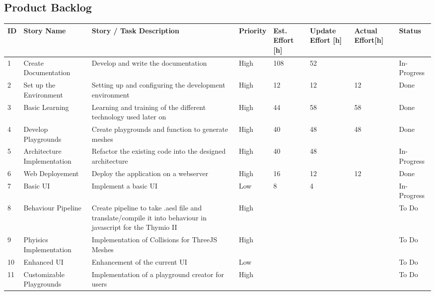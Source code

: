 \documentclass{scrartcl}
\begin{document}
\subsection{Product Backlog}
\begin{table}[]
  \begin{tabular}{l|l|l|l|l|l|l|l}
  ID                     & Story Name & Story / Task Description & Priority & Est. Effort {[}h{]} & Update Effort {[}h{]} & Actual Effort{[}h{]} & Status                \\ \hline
  \multicolumn{1}{|l|}{1} & Create Documentation & Develop and write the documentation & High & 108 & 52 &  & \multicolumn{1}{l|}{In-Progress} \\ \hline
  \multicolumn{1}{|l|}{2} & Set up the Environment & Setting up and configuring the development environment & High & 12 & 12 & 12 & \multicolumn{1}{l|}{Done} \\ \hline
  \multicolumn{1}{|l|}{3} & Basic Learning & Learning and training of the different technology used later on & High & 44 & 58 & 58 & \multicolumn{1}{l|}{Done} \\ \hline
  \multicolumn{1}{|l|}{4} & Develop Playgrounds & Create playgrounds and function to generate meshes & High & 40 & 48 & 48 & \multicolumn{1}{l|}{Done} \\ \hline
  \multicolumn{1}{|l|}{5} & Architecture Implementation & Refactor the existing code into the designed architecture & High & 40 & 48 &  & \multicolumn{1}{l|}{In-Progress} \\ \hline
  \multicolumn{1}{|l|}{6} & Web Deployement & Deploy the application on a webserver & High & 16 & 12 & 12 & \multicolumn{1}{l|}{Done} \\ \hline
  \multicolumn{1}{|l|}{7} & Basic UI & Implement a basic UI & Low & 8 & 4 &  & \multicolumn{1}{l|}{In-Progress} \\ \hline
  \multicolumn{1}{|l|}{8} & Behaviour Pipeline & Create pipeline to take .aesl file and translate/compile it into behaviour in javascript for the Thymio II & High &  &  &  & \multicolumn{1}{l|}{To Do} \\ \hline
  \multicolumn{1}{|l|}{9} & Phyisics Implementation & Implementation of Collisions for ThreeJS Meshes & High &  &  &  & \multicolumn{1}{l|}{To Do} \\ \hline
  \multicolumn{1}{|l|}{10} & Enhanced UI & Enhancement of the current UI & Low &  &  &  & \multicolumn{1}{l|}{To Do} \\ \hline
  \multicolumn{1}{|l|}{11} & Customizable Playgrounds & Implementation of a playground creator for users & High &  &  &  & \multicolumn{1}{l|}{To Do} \\ \hline

\end{tabular}
\end{table}
\end{document}

